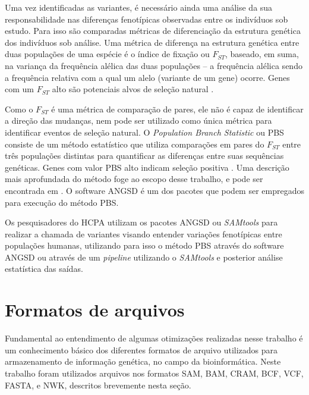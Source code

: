 \documentclass[cic,tc]{iiufrgs}
\begin{document}
Uma vez identificadas as variantes, é necessário ainda uma análise da sua
responsabilidade nas diferenças fenotípicas observadas entre os indivíduos sob
estudo. Para isso são comparadas métricas de diferenciação da estrutura
genética dos indivíduos sob análise. Uma métrica de diferença na estrutura
genética entre duas populações de uma espécie é o índice de fixação ou
$F_{ST}$, baseado, em suma, na variança da frequência alélica das duas
populações -- a frequência alélica sendo a frequência relativa com a qual um
alelo (variante de um gene) ocorre. Genes com um $F_{ST}$ alto são potenciais
alvos de seleção natural \cite{yi2010sequencing}.

Como o $F_{ST}$ é uma métrica de comparação de pares, ele não é capaz de
identificar a direção das mudanças, nem pode ser utilizado como única métrica
para identificar eventos de seleção natural. O \textit{Population Branch
Statistic} ou PBS consiste de um método estatístico que utiliza comparações em
pares do $F_{ST}$ entre três populações distintas para quantificar as
diferenças entre suas sequências genéticas. Genes com valor PBS alto indicam
seleção positiva \cite{jiang2019population}. Uma descrição mais aprofundada do
método foge ao escopo desse trabalho, e pode ser encontrada em
\cite{yi2010sequencing}. O software ANGSD é um dos pacotes que podem ser
empregados para execução do método PBS.

Os pesquisadores do HCPA utilizam os pacotes ANGSD ou \textit{SAMtools} para realizar a
chamada de variantes visando entender variações fenotípicas entre populações
humanas, utilizando para isso o método PBS através do software ANGSD ou através
de um \textit{pipeline} utilizando o \textit{SAMtools} e posterior análise estatística das
saídas.

\section{Formatos de arquivos}
\label{sec:formats}


Fundamental ao entendimento de algumas otimizações realizadas nesse trabalho é
um conhecimento básico dos diferentes formatos de arquivo utilizados para
armazenamento de informação genética, no campo da bioinformática. Neste
trabalho foram utilizados arquivos nos formatos SAM, BAM, CRAM, BCF, VCF,
FASTA, e NWK, descritos brevemente nesta seção.
\end{document}
